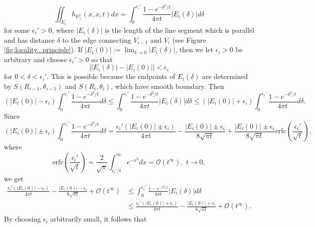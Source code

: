 \documentclass{amsart}
\theoremstyle{definition}
\newcommand*{\R}{\mathbb{R}}
\begin{document}
\begin{equation*}
    \iint_{E_i} h_{\R_+^2}(x,x,t) dx = \int_0^{\epsilon_i'} \frac{1 - e^{-\delta^2/t}}{4\pi t} |E_i(\delta)| d\delta
\end{equation*}
for some $\epsilon_i' > 0$, where $|E_i(\delta)|$ is the length of the line segment which is parallel and has distance $\delta$ to the edge connecting $V_{i-1}$ and $V_i$ (see Figure \ref{fig:locality_principle}). If $|E_i(0)| := \lim_{\delta \to 0} |E_i(\delta)|$, then we let $\epsilon_i > 0$ be arbitrary and choose $\epsilon_i' > 0$ so that
\begin{equation*}
    \big||E_i(\delta)| - |E_i(0)|\big| < \epsilon_i
\end{equation*}
for $0 < \delta < \epsilon_i'$. This is possible because the endpoints of $E_i(\delta)$ are determined by $S(R_{i-1},\theta_{i-1})$ and $S(R_i,\theta_i)$, which have smooth boundary. Then
\begin{equation*}
    (|E_i(0)| - \epsilon_i)\int_0^{\epsilon_i'} \frac{1 - e^{-\delta^2/t}}{4\pi t} d\delta \leq \int_0^{\epsilon_i'} \frac{1 - e^{-\delta^2/t}}{4\pi t} |E_i(\delta)| d\delta \leq (|E_i(0)| + \epsilon_i)\int_0^{\epsilon_i'} \frac{1 - e^{-\delta^2/t}}{4\pi t} d\delta.
\end{equation*}
Since
\begin{equation*}
    (|E_i(0)| \pm \epsilon_i)\int_0^{\epsilon_i'} \frac{1 - e^{-\delta^2/t}}{4\pi t} d\delta = \frac{\epsilon_i'(|E_i(0)| \pm \epsilon_i)}{4\pi t} - \frac{|E_i(0)| \pm \epsilon_i}{8\sqrt{\pi t}} + \frac{|E_i(0)| \pm \epsilon_i}{8\sqrt{\pi t}}\text{erfc}\left(\frac{\epsilon_i'}{\sqrt{t}}\right),
\end{equation*}
where 
\begin{equation*}
    \text{erfc}\left(\frac{\epsilon_i'}{\sqrt{t}}\right) = \frac{2}{\sqrt{\pi}} \int_{\epsilon_i'/t}^\infty e^{-x^2} dx = \mathcal{O}(t^\infty), \,\, t \to 0, %
\end{equation*}
we get
\begin{align*}
    \frac{\epsilon_i'(|E_i(0)| - \epsilon_i)}{4\pi t} - \frac{|E_i(0)| - \epsilon_i}{8\sqrt{\pi t}} + \mathcal{O}(t^\infty) &\leq \int_0^{\epsilon_i'} \frac{1 - e^{-\delta^2/t}}{4\pi t} |E_i(\delta)| d\delta \\
    &\leq \frac{\epsilon_i'(|E_i(0)| + \epsilon_i)}{4\pi t} - \frac{|E_i(0)| + \epsilon_i}{8\sqrt{\pi t}} + \mathcal{O}(t^\infty).
\end{align*}
By choosing $\epsilon_i$ arbitrarily small, it follows that 
\end{document}
